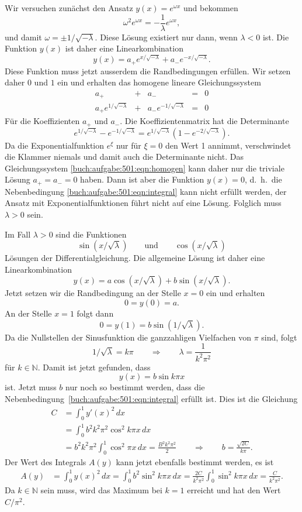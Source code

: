 \begin{loesung}
Wir versuchen zunächst den Ansatz $y(x)=e^{\omega x}$ und bekommen
\[
\omega^2e^{\omega x} = -\frac{1}{\lambda} e^{\omega x},
\]
und damit $\omega=\pm1/\!\sqrt{-\lambda}$.
Diese Lösung existiert nur dann, wenn $\lambda<0$ ist.
Die Funktion $y(x)$ ist daher eine Linearkombination 
\[
y(x) = a_+ e^{x/\!\sqrt{-\lambda}} + a_- e^{-x/\!\sqrt{-\lambda}}.
\]
Diese Funktion muss jetzt ausserdem die Randbedingungen erfüllen.
Wir setzen daher $0$ und $1$ ein und erhalten das homogene lineare
Gleichungssystem
\begin{equation}
\renewcommand{\arraycolsep}{3pt}
\begin{array}{lclcl}
a_+                        &+& a_-                         &=& 0 \\
a_+e^{1/\!\sqrt{-\lambda}} &+& a_-e^{-1/\!\sqrt{-\lambda}} &=& 0
\end{array}
\label{buch:aufgabe:501:eqn:homogen}
\end{equation}
Für die Koeffizienten $a_+$ und $a_-$.
Die Koeffizientenmatrix hat die Determinante
\[
e^{1/\!\sqrt{-\lambda}}-e^{-1/\!\sqrt{-\lambda}}
=
e^{1/\!\sqrt{-\lambda}}(1-e^{-2/\!\sqrt{-\lambda}}).
\]
Da die Exponentialfunktion $e^\xi$ nur für $\xi=0$ den Wert
1 annimmt, verschwindet die Klammer niemals und damit auch die
Determinante nicht.
Das Gleichungssystem \eqref{buch:aufgabe:501:eqn:homogen}
kann daher nur die triviale Lösung $a_+=a_-=0$ haben.
Dann ist aber die Funktion $y(x)=0$, d.~h.~die Nebenbedingung
\eqref{buch:aufgabe:501:eqn:integral} kann nicht erfüllt werden, 
der Ansatz mit Exponentialfunktionen führt nicht auf eine Lösung.
Folglich muss $\lambda>0$ sein.

Im Fall $\lambda>0$ sind die Funktionen
\[
\sin(x/\!\sqrt{\lambda})
\qquad\text{und}\qquad
\cos(x/\!\sqrt{\lambda})
\]
Lösungen der Differentialgleichung.
Die allgemeine Lösung ist daher eine Linearkombination
\[
y(x)
=
a \cos(x/\!\sqrt{\lambda})
+
b \sin(x/\!\sqrt{\lambda}).
\]
Jetzt setzen wir die Randbedingung an der Stelle $x=0$ ein und erhalten
\[
0
=
y(0)
=
a.
\]
An der Stelle $x=1$ folgt dann
\[
0=y(1)
=
b\sin(1/\!\sqrt{\lambda}).
\]
Da die Nullstellen der Sinusfunktion die ganzzahligen Vielfachen von $\pi$
sind, folgt
\[
1/\!\sqrt{\lambda} = k\pi
\qquad\Rightarrow\qquad
\lambda = \frac{1}{k^2\pi^2}
\]
für $k\in\mathbb{N}$.
Damit ist jetzt gefunden, dass
\[
y(x) = b \sin k\pi x
\]
ist.
Jetzt muss $b$ nur noch so bestimmt werden, dass die
Nebenbedingung~\eqref{buch:aufgabe:501:eqn:integral} erfüllt ist.
Dies ist die Gleichung
\begin{align*}
C
&=
\int_0^1 y'(x)^2\,dx
\\
&=
\int_0^1 b^2 k^2\pi^2 \cos^2 k\pi x\,dx
\\
&=
b^2k^2\pi^2 \int_0^1 \cos^2 \pi x\,dx
=
\frac{B^2k^2\pi^2}2
\qquad
\Rightarrow
\qquad
b
=
\frac{\!\sqrt{2C}}{k\pi}.
\end{align*}
Der Wert des Integrals $A(y)$ kann jetzt ebenfalls bestimmt werden, es
ist
\begin{align*}
A(y)
&=
\int_0^1 y(x)^2\,dx
=
\int_0^1 b^2\sin^2 k\pi x\,dx
=
\frac{2C}{k^2\pi^2} \int_0^1 \sin^2k\pi x\,dx
=
\frac{C}{k^2\pi^2}.
\end{align*}
Da $k\in\mathbb{N}$ sein muss, wird das Maximum bei $k=1$ erreicht und
hat den Wert $C/\pi^2$.
\end{loesung}
